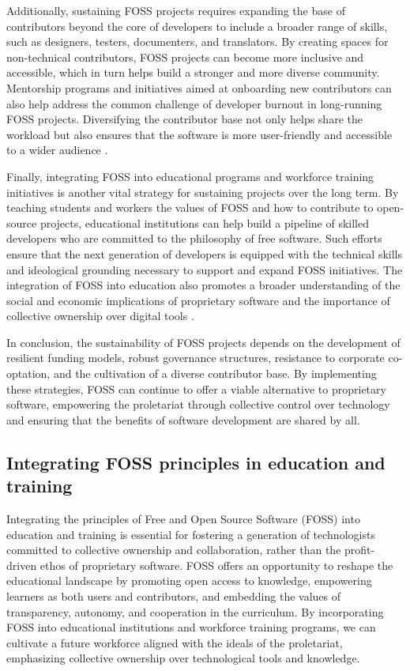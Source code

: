 \begin{refsection}
Additionally, sustaining FOSS projects requires expanding the base of contributors beyond the core of developers to include a broader range of skills, such as designers, testers, documenters, and translators. By creating spaces for non-technical contributors, FOSS projects can become more inclusive and accessible, which in turn helps build a stronger and more diverse community. Mentorship programs and initiatives aimed at onboarding new contributors can also help address the common challenge of developer burnout in long-running FOSS projects. Diversifying the contributor base not only helps share the workload but also ensures that the software is more user-friendly and accessible to a wider audience \cite[pp.~78-80]{weber2005}.

Finally, integrating FOSS into educational programs and workforce training initiatives is another vital strategy for sustaining projects over the long term. By teaching students and workers the values of FOSS and how to contribute to open-source projects, educational institutions can help build a pipeline of skilled developers who are committed to the philosophy of free software. Such efforts ensure that the next generation of developers is equipped with the technical skills and ideological grounding necessary to support and expand FOSS initiatives. The integration of FOSS into education also promotes a broader understanding of the social and economic implications of proprietary software and the importance of collective ownership over digital tools \cite[pp.~45-47]{raymond2022}.

In conclusion, the sustainability of FOSS projects depends on the development of resilient funding models, robust governance structures, resistance to corporate co-optation, and the cultivation of a diverse contributor base. By implementing these strategies, FOSS can continue to offer a viable alternative to proprietary software, empowering the proletariat through collective control over technology and ensuring that the benefits of software development are shared by all.

\subsection{Integrating FOSS principles in education and training}

Integrating the principles of Free and Open Source Software (FOSS) into education and training is essential for fostering a generation of technologists committed to collective ownership and collaboration, rather than the profit-driven ethos of proprietary software. FOSS offers an opportunity to reshape the educational landscape by promoting open access to knowledge, empowering learners as both users and contributors, and embedding the values of transparency, autonomy, and cooperation in the curriculum. By incorporating FOSS into educational institutions and workforce training programs, we can cultivate a future workforce aligned with the ideals of the proletariat, emphasizing collective ownership over technological tools and knowledge.


\end{refsection}
